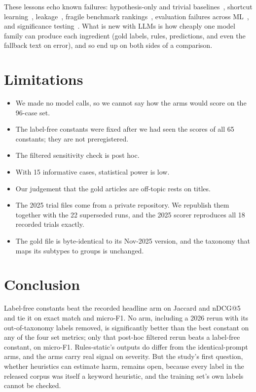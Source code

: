 \documentclass[10pt,twocolumn]{article}
\begin{document}
These lessons echo known failures: hypothesis-only and trivial
baselines~\cite{gururangan2018,poliak2018}, shortcut learning~\cite{geirhos2020},
leakage~\cite{kapoor2023}, fragile benchmark rankings~\cite{dehghani2021},
evaluation failures across ML~\cite{liao2021}, and significance
testing~\cite{dror2018}. What is new with LLMs is how cheaply one model family
can produce each ingredient (gold labels, rules, predictions, and even the
fallback text on error), and so end up on both sides of a comparison.

\section{Limitations}

\begin{itemize}
  \item We made no model calls, so we cannot say how the arms would score on
        the 96-case set.
  \item The label-free constants were fixed after we had seen the scores of
        all 65 constants; they are not preregistered.
  \item The filtered sensitivity check is post hoc.
  \item With 15 informative cases, statistical power is low.
  \item Our judgement that the gold articles are off-topic rests on titles.
  \item The 2025 trial files come from a private repository. We republish
        them together with the 22 superseded runs, and the 2025 scorer
        reproduces all 18 recorded trials exactly.
  \item The gold file is byte-identical to its Nov-2025 version, and the
        taxonomy that maps its subtypes to groups is unchanged.
\end{itemize}

\section{Conclusion}

Label-free constants beat the recorded headline arm on Jaccard and nDCG@5 and
tie it on exact match and micro-F1. No arm, including a 2026 rerun with its
out-of-taxonomy labels removed, is significantly better than the best constant
on any of the four set metrics; only that post-hoc filtered rerun beats a
label-free constant, on micro-F1. Rules-static's outputs do differ from the
identical-prompt arms, and the arms carry real signal on severity. But the study's first question, whether heuristics can estimate harm,
remains open, because every label in the released corpus was itself a keyword
heuristic, and the training set's own labels cannot be checked.
\end{document}
